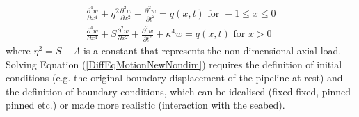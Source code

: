 \documentclass[3p,doublespacing,authoryear,11pt]{elsarticle} %
\begin{document}

 \begin{equation}\label{DiffEqMotionNewNondim}
 \begin{array}{l } 
\displaystyle  \frac{\partial^4 w}{\partial x^4} + \eta ^2 \frac{\partial^2 w}{\partial x^2}  + \frac{\partial^2 w}{\partial t^2} = q (x,t) \text{ for } -1 \le x \le 0 \\
\displaystyle  \frac{\partial^4 w}{\partial x^4} + S \frac{\partial^2 w}{\partial x^2} + \frac{\partial^2 w}{\partial t^2} + \kappa^4 w  =  q (x,t) \text{ for } x > 0
  \end{array}  
\end{equation}
where $\eta^2 = S-\Lambda$ is a constant that represents the non-dimensional axial load. Solving Equation (\ref{DiffEqMotionNewNondim}) requires the definition of initial conditions (e.g. the original boundary displacement of the pipeline at rest) and the definition of boundary conditions, which can be idealised (fixed-fixed, pinned-pinned etc.) or made more realistic (interaction with the seabed).  
\end{document}
